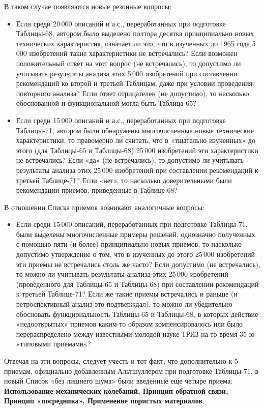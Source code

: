 \documentclass[11pt,a4paper]{article}
\begin{document}
В таком случае появляются новые резонные вопросы:
\begin{itemize}
\item Если среди 20\,000 описаний и а.с., переработанных при подготовке
  Таблицы-68, автором было выделено полтора десятка принципиально новых
  технических характеристик, означает ли это, что в изученных до 1965 года
  5\,000 изобретений такие характеристики не встречались? Если возможен
  положительный ответ на этот вопрос (не встречались), то допустимо ли
  учитывать результаты анализа этих 5\,000 изобретений при составлении
  рекомендаций ко второй и третьей Таблицам, даже при условии проведения
  повторного анализа? Если ответ отрицателен (не допустимо), то насколько
  обоснованной и функциональной могла быть Таблица-65?
\item Если среди 15\,000 описаний и а.с., переработанных при подготовке
  Таблицы-71, автором были обнаружены многочисленные новые технические
  характеристики, то правомерно ли считать, что в «тщательно изученных» до
  этого (для Таблицы-65 и Таблицы-68) 25\,000 изобретений эти характеристики
  не встречались? Если «да» (не встречались), то допустимо ли учитывать
  результаты анализа этих 25\,000 изобретений при составлении рекомендаций к
  третьей Таблице-71? Если «нет», то насколько доверительными были
  рекомендации приемов, приведенные в Таблице-68?
\end{itemize}
В отношении Списка приемов возникают аналогичные вопросы:
\begin{itemize}
\item Если среди 15\,000 описаний, переработанных при подготовке Таблицы-71,
  были выделены многочисленные примеры решений, однозначно полученных с
  помощью пяти (и более) принципиально новых приемов, то насколько допустимо
  утверждение о том, что в изученных до этого 25\,000 изобретений эти приемы
  не встречались столь же часто? Если допустимо (не встречались), то можно ли
  учитывать результаты анализа этих 25\,000 изобретений (проведенного для
  Таблицы-65 и Таблицы-68) при составлении рекомендаций к третьей Таблице-71?
  Если же такие приемы встречались и раньше (и ретроспективный анализ это
  подтверждал), то можно ли убедительно обосновать функциональность Таблицы-65
  и Таблицы-68, в которых действие «недооткрытых» приемов каким-то образом
  компенсировалось или было перераспределено между известными молодой науке
  ТРИЗ на то время 35-ю «типовыми приемами«?
\end{itemize}
Отвечая на эти вопросы, следует учесть и тот факт, что дополнительно к 5
приемам, официально добавленным Альтшуллером при подготовке Таблицы-71, в
новый Список «без лишнего шума» были введенные еще четыре приема:
\textbf{Использование механических колебаний, Принцип обратной связи, Принцип
  «посредника», Применение пористых материалов}.
\end{document}
